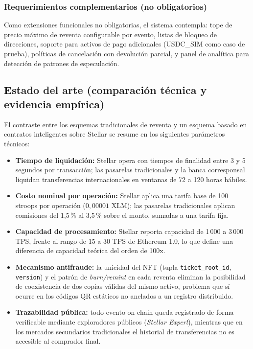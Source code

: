 \subsubsection{Requerimientos complementarios (no obligatorios)}

Como extensiones funcionales no obligatorias, el sistema contempla: tope de precio máximo de reventa configurable por evento, listas de bloqueo de direcciones, soporte para activos de pago adicionales (USDC\_SIM como caso de prueba), políticas de cancelación con devolución parcial, y panel de analítica para detección de patrones de especulación.

\subsection{Estado del arte (comparación técnica y evidencia empírica)}

El contraste entre los esquemas tradicionales de reventa y un esquema basado en contratos inteligentes sobre Stellar se resume en los siguientes parámetros técnicos:

\begin{itemize}
    \item \textbf{Tiempo de liquidación:} Stellar opera con tiempos de finalidad entre 3 y 5 segundos por transacción; las pasarelas tradicionales y la banca corresponsal liquidan transferencias internacionales en ventanas de 72 a 120 horas hábiles.
    \item \textbf{Costo nominal por operación:} Stellar aplica una tarifa base de 100 stroops por operación (\(0{,}00001\) XLM); las pasarelas tradicionales aplican comisiones del 1{,}5\,\% al 3{,}5\,\% sobre el monto, sumadas a una tarifa fija.
    \item \textbf{Capacidad de procesamiento:} Stellar reporta capacidad de 1\,000 a 3\,000 TPS, frente al rango de 15 a 30 TPS de Ethereum 1.0, lo que define una diferencia de capacidad teórica del orden de 100x.
    \item \textbf{Mecanismo antifraude:} la unicidad del NFT (tupla \texttt{ticket\_root\_id}, \texttt{version}) y el patrón de \textit{burn/remint} en cada reventa eliminan la posibilidad de coexistencia de dos copias válidas del mismo activo, problema que sí ocurre en los códigos QR estáticos no anclados a un registro distribuido.
    \item \textbf{Trazabilidad pública:} todo evento on-chain queda registrado de forma verificable mediante exploradores públicos (\textit{Stellar Expert}), mientras que en los mercados secundarios tradicionales el historial de transferencias no es accesible al comprador final.
\end{itemize}

